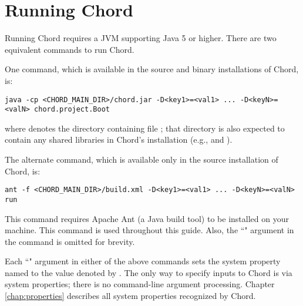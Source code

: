 \section{Running Chord}
\label{sec:running-chord}

Running Chord requires a JVM supporting Java 5 or higher.  There are two
equivalent commands to run Chord.

One command, which is available in the source and binary installations of
Chord, is:

\begin{framed}
\begin{verbatim}
java -cp <CHORD_MAIN_DIR>/chord.jar -D<key1>=<val1> ... -D<keyN>=<valN> chord.project.Boot
\end{verbatim}
\end{framed}

where  denotes the directory containing file ; that directory is also expected
to contain any shared libraries in Chord's installation (e.g.,  and ).

The alternate command, which is available only in the source installation of
Chord, is:

\begin{framed}
\begin{verbatim}
ant -f <CHORD_MAIN_DIR>/build.xml -D<key1>=<val1> ... -D<keyN>=<valN> run
\end{verbatim}
\end{framed}

This command requires Apache Ant (a Java build tool) to be installed on your
machine.  This command is used throughout this guide.  Also, the
``" argument in the command is omitted
for brevity.

Each ``" argument in either of the above commands sets the
system property named  to the value denoted by .  The
only way to specify inputs to Chord is via system properties; there is no
command-line argument processing.  Chapter \ref{chap:properties} describes all
system properties recognized by Chord.

